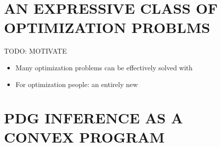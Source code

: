 \documentclass[twoside]{article}
\begin{document}
% 
% 



{\color{gray!80!white}
    \section{AN EXPRESSIVE CLASS OF OPTIMIZATION PROBLMS} 
    
    
    TODO: MOTIVATE 
    
    \begin{itemize}
        \item 
        Many optimization problems can be effectively solved with         
    \end{itemize}
    
    \begin{itemize}
        \item 
        For optimization people: an entirely new 
    \end{itemize}
    
}

\section{PDG INFERENCE AS A CONVEX PROGRAM}
    \label{sec:inf-as-cvx-program}
\end{document}
